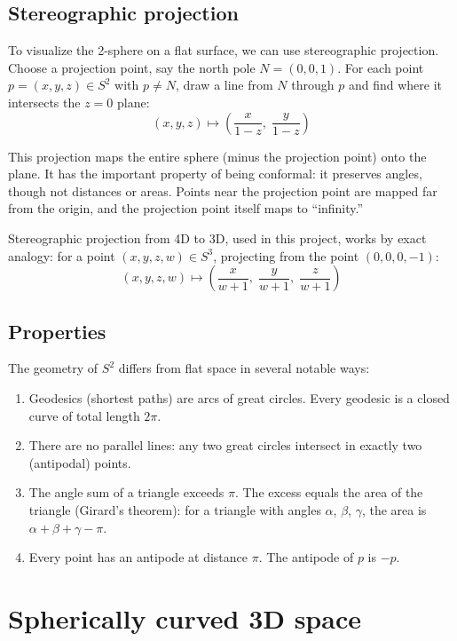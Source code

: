 \documentclass[twocolumn,10pt]{article}
\begin{document}
\subsection{Stereographic projection}

To visualize the 2-sphere on a flat surface, we can use stereographic projection. Choose a projection point, say the north pole $N = (0, 0, 1)$. For each point $p = (x, y, z) \in S^2$ with $p \neq N$, draw a line from $N$ through $p$ and find where it intersects the $z = 0$ plane:
\[
    (x, y, z) \mapsto \left(\frac{x}{1 - z}, \; \frac{y}{1 - z}\right)
\]

This projection maps the entire sphere (minus the projection point) onto the plane. It has the important property of being conformal: it preserves angles, though not distances or areas. Points near the projection point are mapped far from the origin, and the projection point itself maps to ``infinity.''

Stereographic projection from 4D to 3D, used in this project, works by exact analogy: for a point $(x, y, z, w) \in S^3$, projecting from the point $(0, 0, 0, -1)$:
\[
    (x, y, z, w) \mapsto \left(\frac{x}{w + 1}, \; \frac{y}{w + 1}, \; \frac{z}{w + 1}\right)
\]

\subsection{Properties}

The geometry of $S^2$ differs from flat space in several notable ways:
\begin{enumerate}
    \item Geodesics (shortest paths) are arcs of great circles. Every geodesic is a closed curve of total length $2\pi$.
    \item There are no parallel lines: any two great circles intersect in exactly two (antipodal) points.
    \item The angle sum of a triangle exceeds $\pi$. The excess equals the area of the triangle (Girard's theorem): for a triangle with angles $\alpha$, $\beta$, $\gamma$, the area is $\alpha + \beta + \gamma - \pi$.
    \item Every point has an antipode at distance $\pi$. The antipode of $p$ is $-p$.
\end{enumerate}


\section{Spherically curved 3D space}
\end{document}
